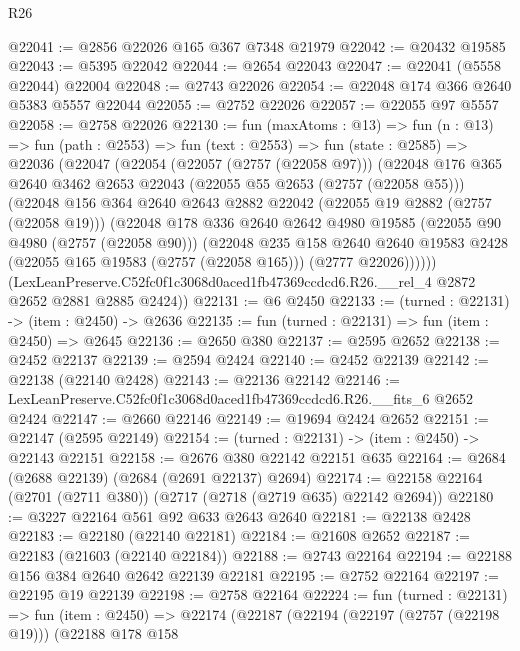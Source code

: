 \begin{lexlean}{R26}
\begin{coremodule}
@22041 := @2856 @22026 @165 @367 @7348 @21979
@22042 := @20432 @19585
@22043 := @5395 @22042
@22044 := @2654 @22043
@22047 := @22041 (@5558 @22044) @22004
@22048 := @2743 @22026
@22054 := @22048 @174 @366 @2640 @5383 @5557 @22044
@22055 := @2752 @22026
@22057 := @22055 @97 @5557
@22058 := @2758 @22026
@22130 := fun (maxAtoms : @13) =>
  fun (n : @13) =>
  fun (path : @2553) =>
  fun (text : @2553) =>
  fun (state : @2585) =>
  @22036
    (@22047
      (@22054
        (@22057 (@2757 (@22058 @97)))
        (@22048
          @176
          @365
          @2640
          @3462
          @2653
          @22043
          (@22055 @55 @2653 (@2757 (@22058 @55)))
          (@22048
            @156
            @364
            @2640
            @2643
            @2882
            @22042
            (@22055 @19 @2882 (@2757 (@22058 @19)))
            (@22048
              @178
              @336
              @2640
              @2642
              @4980
              @19585
              (@22055 @90 @4980 (@2757 (@22058 @90)))
              (@22048
                @235
                @158
                @2640
                @2640
                @19583
                @2428
                (@22055 @165 @19583 (@2757 (@22058 @165)))
                (@2777 @22026))))))
      (LexLeanPreserve.C52fc0f1c3068d0aced1fb47369ccdcd6.R26.__rel_4 @2872 @2652 @2881 @2885 @2424))
@22131 := @6 @2450
@22133 := (turned : @22131) -> (item : @2450) -> @2636
@22135 := fun (turned : @22131) => fun (item : @2450) => @2645
@22136 := @2650 @380
@22137 := @2595 @2652
@22138 := @2452 @22137
@22139 := @2594 @2424
@22140 := @2452 @22139
@22142 := @22138 (@22140 @2428)
@22143 := @22136 @22142
@22146 := LexLeanPreserve.C52fc0f1c3068d0aced1fb47369ccdcd6.R26.__fits_6 @2652 @2424
@22147 := @2660 @22146
@22149 := @19694 @2424 @2652
@22151 := @22147 (@2595 @22149)
@22154 := (turned : @22131) -> (item : @2450) -> @22143 @22151
@22158 := @2676 @380 @22142 @22151 @635
@22164 := @2684 (@2688 @22139) (@2684 (@2691 @22137) @2694)
@22174 := @22158 @22164 (@2701 (@2711 @380)) (@2717 (@2718 (@2719 @635) @22142 @2694))
@22180 := @3227 @22164 @561 @92 @633 @2643 @2640
@22181 := @22138 @2428
@22183 := @22180 (@22140 @22181)
@22184 := @21608 @2652
@22187 := @22183 (@21603 (@22140 @22184))
@22188 := @2743 @22164
@22194 := @22188 @156 @384 @2640 @2642 @22139 @22181
@22195 := @2752 @22164
@22197 := @22195 @19 @22139
@22198 := @2758 @22164
@22224 := fun (turned : @22131) =>
  fun (item : @2450) =>
  @22174
    (@22187
      (@22194
        (@22197 (@2757 (@22198 @19)))
        (@22188
          @178
          @158

\end{coremodule}
\end{lexlean}
